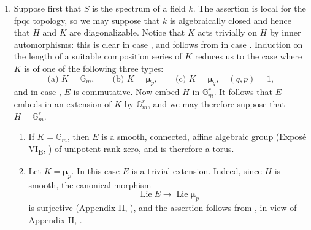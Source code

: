 
\begin{enumerate}
\item[\SGAInlineRefTarget{sga3:xvii:proposition:7:1:1:item:i}(i)] Suppose first that \(S\) is the spectrum of a field
  \(k\).  The assertion is local for the fpqc topology, so we may
  suppose that \(k\) is algebraically closed and hence that \(H\)
  and \(K\) are diagonalizable.  Notice that \(K\) acts trivially
  on \(H\) by inner automorphisms: this is clear in case , and
  follows from  in case .  Induction on the length of a
  suitable composition series of \(K\) reduces us to the case
  where \(K\) is of one of the following three types:
  \[
    \text{(a) }K=\mathbb G_m,\qquad
    \text{(b) }K=\boldsymbol\mu_p,\qquad
    \text{(c) }K=\boldsymbol\mu_q,\quad(q,p)=1,
  \]
  and in case , \(E\) is commutative.  Now embed \(H\) in
  \(\mathbb G_m^r\).  It follows that \(E\) embeds in an extension
  of \(K\) by \(\mathbb G_m^r\), and we may therefore suppose that
  \(H=\mathbb G_m^r\).

  \begin{enumerate}
  \item[(a)] If \(K=\mathbb G_m\), then \(E\) is a smooth,
    connected, affine algebraic group (Exposé VI\textsubscript{B},
    ) of unipotent rank zero, and is therefore a torus.

  \item[(b)] Let \(K=\boldsymbol\mu_p\).  In this case \(E\) is a
    trivial extension.  Indeed, since \(H\) is smooth, the
    canonical morphism
    \[
      \operatorname{Lie}E\longrightarrow
      \operatorname{Lie}\boldsymbol\mu_p
    \]
    is surjective (Appendix II, ), and the assertion follows
    from , in view of Appendix II, .


\end{enumerate}
\end{enumerate}
